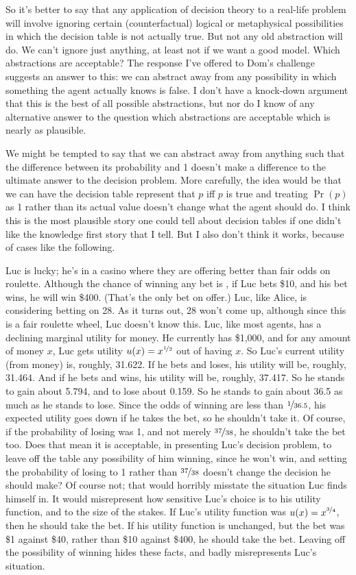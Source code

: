 So it's better to say that any application of decision theory to a real-life problem will involve ignoring certain (counterfactual) logical or metaphysical possibilities in which the decision table is not actually true. But not any old abstraction will do. We can't ignore just anything, at least not if we want a good model. Which abstractions are acceptable? The response I've offered to Dom's challenge suggests an answer to this: we can abstract away from any possibility in which something the agent actually knows is false. I don't have a knock-down argument that this is the best of all possible abstractions, but nor do I know of any alternative answer to the question which abstractions are acceptable which is nearly as plausible.

We might be tempted to say that we can abstract away from anything such that the difference between its probability and 1 doesn't make a difference to the ultimate answer to the decision problem. More carefully, the idea would be that we can have the decision table represent that $p$ iff $p$ is true and treating $\Pr(p)$ as 1 rather than its actual value doesn't change what the agent should do. I think this is the most plausible story one could tell about decision tables if one didn't like the knowledge first story that I tell. But I also don't think it works, because of cases like the following.

Luc is lucky; he's in a casino where they are offering better than fair odds on roulette. Although the chance of winning any bet is , if Luc bets \$10, and his bet wins, he will win \$400. (That's the only bet on offer.) Luc, like Alice, is considering betting on 28. As it turns out, 28 won't come up, although since this is a fair roulette wheel, Luc doesn't know this. Luc, like most agents, has a declining marginal utility for money. He currently has \$1,000, and for any amount of money $x$, Luc gets utility $u(x) = x^{\nicefrac{1}{2}}$ out of having $x$. So Luc's current utility (from money) is, roughly, 31.622. If he bets and loses, his utility will be, roughly, 31.464. And if he bets and wins, his utility will be, roughly, 37.417. So he stands to gain about 5.794, and to lose about 0.159. So he stands to gain about 36.5 as much as he stands to lose. Since the odds of winning are less than $\nicefrac{1}{36.5}$, his expected utility goes down if he takes the bet, so he shouldn't take it. Of course, if the probability of losing was 1, and not merely $\nicefrac{37}{38}$, he shouldn't take the bet too. Does that mean it is acceptable, in presenting Luc's decision problem, to leave off the table any possibility of him winning, since he won't win, and setting the probability of losing to 1 rather than $\nicefrac{37}{38}$ doesn't change the decision he should make? Of course not; that would horribly misstate the situation Luc finds himself in. It would misrepresent  how sensitive Luc's choice is to his utility function, and to the size of the stakes. If Luc's utility function was $u(x) = x^{\nicefrac{3}{4}}$, then he should take the bet. If his utility function is unchanged, but the bet was \$1 against \$40, rather than \$10 against \$400, he should take the bet. Leaving off the possibility of winning hides these facts, and badly misrepresents Luc's situation.

